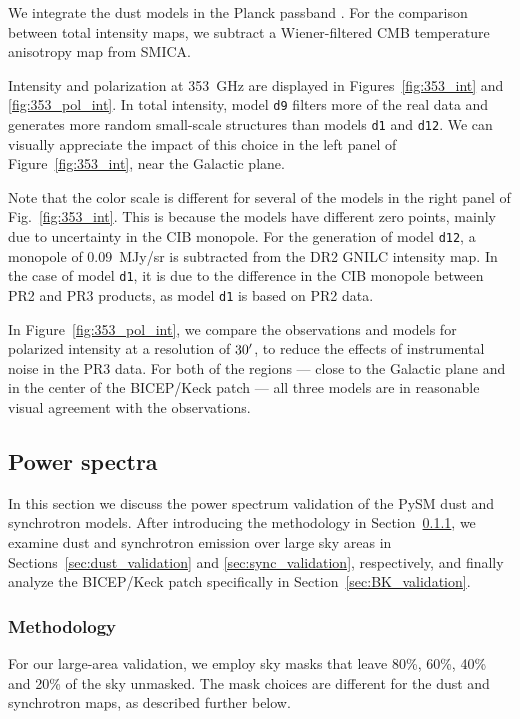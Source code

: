 \documentclass[twocolumn]{aastex631}
\begin{document}
We integrate the dust models in the Planck passband \citep{planck2013-p03d}. For the comparison between total intensity maps, we subtract a Wiener-filtered CMB temperature anisotropy map from SMICA.

Intensity and polarization at 353~GHz are displayed in Figures~\ref{fig:353_int} and \ref{fig:353_pol_int}. 
In total intensity, model {\tt d9} filters more of the real data and generates more random small-scale structures than models {\tt d1} and {\tt d12}. We can visually appreciate the impact of this choice in the left panel of Figure~\ref{fig:353_int}, near the Galactic plane. 

Note that the color scale is different for several of the models in the right panel of Fig.~\ref{fig:353_int}. This is because the models have different zero points, mainly due to uncertainty in the CIB monopole. For the generation of model {\tt d12}, a monopole of 0.09~MJy/sr is subtracted from the DR2 GNILC intensity map. In the case of model {\tt d1}, it is due to the difference in the CIB monopole between PR2 and PR3 products, as model {\tt d1} is based on PR2 data.

In Figure~\ref{fig:353_pol_int}, we compare the observations and models for polarized intensity at a resolution of $30\mbox{$^\prime$}$, to reduce the effects of instrumental noise in the PR3 data. For both of the regions --- close to the Galactic plane and in the center of the BICEP/Keck patch --- all three models are in reasonable visual agreement with the observations. 

\subsection{Power spectra}
\label{sec:PS-validation}
In this section we discuss the power spectrum validation of the PySM dust and synchrotron models. After introducing the methodology in Section~\ref{subsubsec:methods}, we examine dust and synchrotron emission over large sky areas in Sections~\ref{sec:dust_validation} and \ref{sec:sync_validation}, respectively, and finally analyze the BICEP/Keck patch specifically in Section~\ref{sec:BK_validation}.

\subsubsection{Methodology} \label{subsubsec:methods}
For our large-area validation, we employ sky masks that leave 80\%, 60\%, 40\% and 20\% of the sky unmasked. The mask choices are different for the dust and synchrotron maps, as described further below. 
\end{document}
